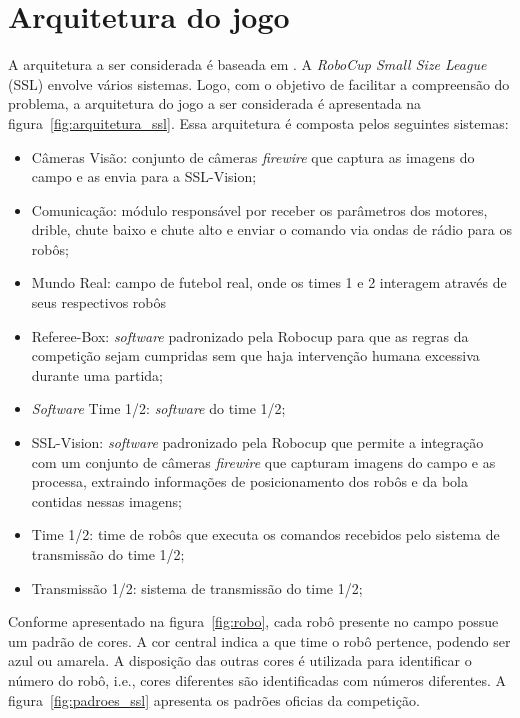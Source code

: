 \section{Arquitetura do jogo}\label{sec:arch_ssl}

A arquitetura a ser considerada é baseada em \cite{felixnavarro}.
A \textit{RoboCup Small Size League} (SSL) envolve vários sistemas.
Logo, com o objetivo de facilitar a compreensão do problema, a
arquitetura do jogo a ser considerada é apresentada na
figura~\ref{fig:arquitetura_ssl}. Essa arquitetura é composta pelos
seguintes sistemas:

\begin{itemize}
  \item Câmeras Visão: conjunto de câmeras \textit{firewire} que captura as imagens do
        campo e as envia para a SSL-Vision;
  \item Comunicação: módulo responsável por receber os parâmetros
        dos motores, drible, chute baixo e chute alto e enviar o comando via
        ondas de rádio para os robôs;
  \item Mundo Real: campo de futebol real, onde os times 1 e 2 interagem
        através de seus respectivos robôs
  \item Referee-Box: \textit{software} padronizado pela Robocup para que as
        regras da competição sejam cumpridas sem que haja intervenção
        humana excessiva durante uma partida;
  \item \textit{Software} Time 1/2: \textit{software} do time 1/2;
  \item SSL-Vision: \textit{software} padronizado pela Robocup que permite a
        integração com um conjunto de câmeras \textit{firewire} que capturam
        imagens do campo e as processa, extraindo informações de posicionamento
        dos robôs e da bola contidas nessas imagens;
  \item Time 1/2: time de robôs que executa os comandos recebidos pelo
        sistema de transmissão do time 1/2;
  \item Transmissão 1/2: sistema de transmissão do time 1/2;
\end{itemize}

Conforme apresentado na figura~\ref{fig:robo}, cada robô presente no campo possue
um padrão de cores. A cor central indica a que time o robô pertence, podendo ser
azul ou amarela. A disposição das outras cores é utilizada para identificar o número
do robô, i.e., cores diferentes são identificadas com números diferentes. A
figura~\ref{fig:padroes_ssl} apresenta os padrões oficias da competição.

